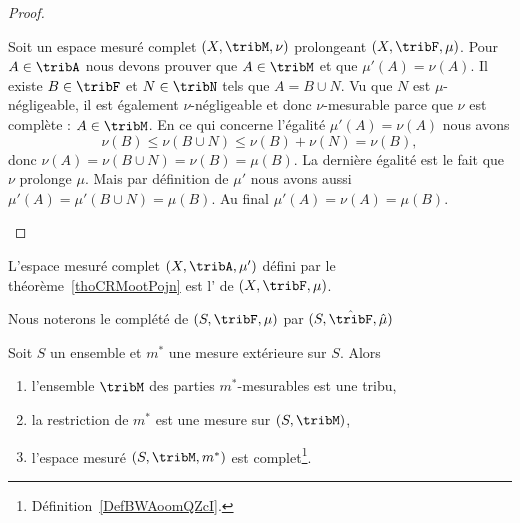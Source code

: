 \begin{proof}
\begin{subproof}
            Soit un espace mesuré complet \( (X,\tribM,\nu)\) prolongeant \( (X,\tribF,\mu)\). Pour \( A\in\tribA\) nous devons prouver que \( A\in\tribM\) et que \( \mu'(A)=\nu(A)\). Il existe \( B\in\tribF\) et \( N\in\tribN\) tels que \( A=B\cup N\). Vu que \( N\) est \( \mu\)-négligeable, il est également \( \nu\)-négligeable et donc \( \nu\)-mesurable parce que \(\nu\) est complète : \( A\in\tribM\). En ce qui concerne l'égalité \( \mu'(A)=\nu(A)\) nous avons
            \begin{equation}
                \nu(B)\leq\nu(B\cup N)\leq \nu(B)+\nu(N)=\nu(B),
            \end{equation}
            donc \( \nu(A)=\nu(B\cup N)=\nu(B)=\mu(B)\). La dernière égalité est le fait que \( \nu\) prolonge \( \mu\). Mais par définition de \( \mu'\) nous avons aussi \( \mu'(A)=\mu'(B\cup N)=\mu(B)\). Au final \( \mu'(A)=\nu(A)=\mu(B)\).
    \end{subproof}
\end{proof}

\begin{definition}
    L'espace mesuré complet \( (X,\tribA,\mu')\) défini par le théorème~\ref{thoCRMootPojn} est l' de \( (X,\tribF,\mu)\).

    Nous noterons le complété de \( (S,\tribF,\mu)\) par \( (S,\hat\tribF,\hat \mu)\)
\end{definition}

\begin{theorem} \label{ThoUUIooaNljH}
    Soit \( S\) un ensemble et \( m^*\) une mesure extérieure sur \( S\). Alors
    \begin{enumerate}
        \item   \label{RPPooHSWWsi}
            l'ensemble \( \tribM\) des parties \( m^*\)-mesurables est une tribu,
        \item
            la restriction de \( m^*\) est une mesure sur \( (S,\tribM)\),
        \item
            l'espace mesuré \( (S,\tribM,m^*)\) est complet\footnote{Définition~\ref{DefBWAoomQZcI}.}.
    \end{enumerate}
\end{theorem}

